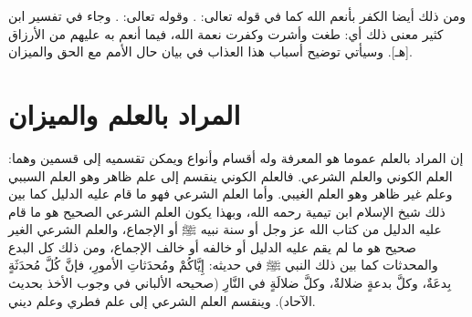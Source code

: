 ومن ذلك أيضا الكفر بأنعم الله كما في قوله تعالى:
\quranayah*[16][112]{\footnotesize \surahname*[16]}. وقوله تعالى:
\quranayah*[28][58]{\footnotesize \surahname*[28]}. وجاء في تفسير ابن كثير معنى ذلك أي: طغت وأشرت وكفرت نعمة الله، فيما أنعم به عليهم من الأرزاق [هـ]. وسيأتي توضيح أسباب هذا العذاب في بيان حال الأمم مع الحق والميزان.

\section{المراد بالعلم والميزان}

إن المراد بالعلم عموما هو المعرفة وله أقسام وأنواع ويمكن تقسميه إلى قسمين وهما: العلم الكوني والعلم الشرعي. فالعلم الكوني ينقسم إلى علم ظاهر وهو العلم السببي وعلم غير ظاهر وهو العلم الغيبي. وأما العلم الشرعي فهو ما قام عليه الدليل كما بين ذلك شيخ الإسلام ابن تيمية رحمه الله، وبهذا يكون العلم الشرعي الصحيح هو ما قام عليه الدليل من كتاب الله عز وجل أو سنة نبيه ﷺ أو الإجماع، والعلم الشرعي الغير صحيح هو ما لم يقم عليه الدليل أو خالفه أو خالف الإجماع، ومن ذلك كل البدع والمحدثات كما بين ذلك النبي ﷺ في حديثه: إِيَّاكُمْ ومُحدَثاتِ الأمورِ، فإنَّ كُلَّ مُحدَثَةٍ بِدعَةٌ، وكلَّ بدعةٍ ضلالةٌ، وكلَّ ضلالَةٍ في النَّارِ {\footnotesize (صحيحه الألباني في وجوب الأخذ بحديث الآحاد)}. وينقسم العلم الشرعي إلى علم فطري وعلم ديني. 

